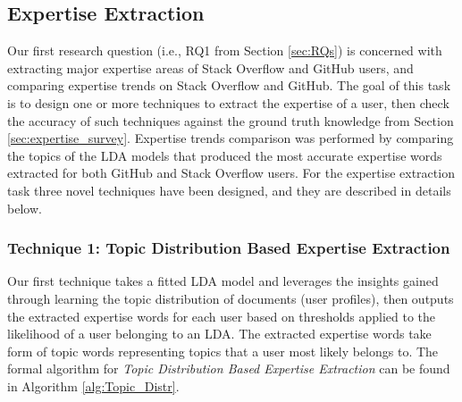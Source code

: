     \subsection{Expertise Extraction\label{RQ1_task}}
        Our first research question (i.e., RQ1 from Section \ref{sec:RQs}) is concerned with extracting major expertise areas of Stack Overflow and GitHub users, and comparing expertise trends on Stack Overflow and GitHub. The goal of this task is to design one or more techniques to extract the expertise of a user, then check the accuracy of such techniques against the ground truth knowledge from Section \ref{sec:expertise_survey}. Expertise trends comparison was performed by comparing the topics of the LDA models that produced the most accurate expertise words extracted for both GitHub and Stack Overflow users. For the expertise extraction task three novel techniques have been designed, and they are described in details below. 
        
        \subsubsection{Technique 1: Topic Distribution Based Expertise Extraction}
            Our first technique takes a fitted LDA model and leverages the insights gained through learning the topic distribution of documents (user profiles), then outputs the extracted expertise words for each user based on thresholds applied to the likelihood of a user belonging to an LDA. The extracted expertise words take form of topic words representing topics that a user most likely belongs to. The formal algorithm for \emph{Topic Distribution Based Expertise Extraction} can be found in Algorithm \ref{alg:Topic_Distr}.
            
